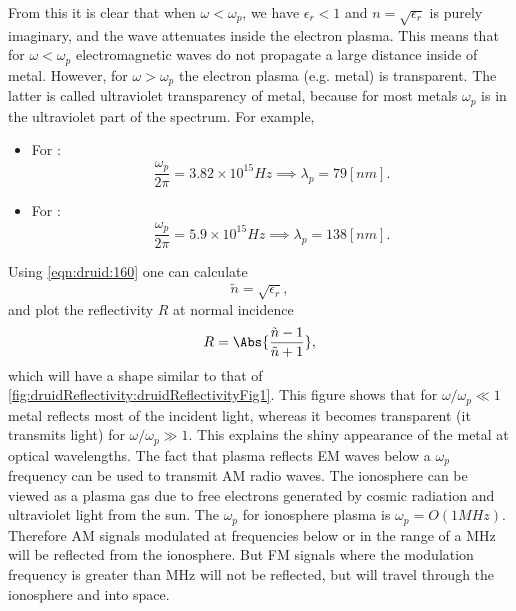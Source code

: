 %
From this it is clear that when \( \omega < \omega_p \), we have \( \epsilon_r < 1 \) and \( n = \sqrt{\epsilon_r} \) is purely imaginary, and the wave attenuates inside the electron plasma.
%
This means that for \( \omega < \omega_p \) electromagnetic waves do not propagate a large distance inside of metal.  However, for \( \omega > \omega_p \) the electron plasma (e.g. metal) is transparent.  The latter is called ultraviolet transparency of metal, because for most metals \( \omega_p \) is in the ultraviolet part of the spectrum.  For example,
%
\begin{itemize}
\item For :
\begin{dmath}\label{eqn:druid:180}
\frac{\omega_p}{2 \pi} = 3.82 \times 10^{15} \si{Hz} \implies \lambda_p = 79 [nm].
\end{dmath}
\item For :
\begin{dmath}\label{eqn:druid:200}
\frac{\omega_p}{2 \pi} = 5.9 \times 10^{15} \si{Hz} \implies \lambda_p = 138 [nm].
\end{dmath}
\end{itemize}
%
Using \cref{eqn:druid:160} one can calculate
%
\begin{dmath}\label{eqn:druid:220}
\tilde{n} = \sqrt{\epsilon_r},
\end{dmath}
%
and plot the reflectivity \( R \) at normal incidence
%
\begin{dmath}\label{eqn:druid:240}
R = \Abs{ \frac{\tilde{n} - 1 }{\tilde{n} + 1} },
\end{dmath}
%
which will have a shape similar to that of \cref{fig:druidReflectivity:druidReflectivityFig1}.
%
%
This figure shows that for \( \omega/\omega_p \ll 1 \) metal reflects most of the incident light, whereas it becomes transparent (it transmits light) for \( \omega/\omega_p \gg 1 \).  This explains the shiny appearance of the metal at optical wavelengths.
%
The fact that plasma reflects EM waves below a \( \omega_p \) frequency can be used to transmit AM radio waves.  The ionosphere can be viewed as a plasma gas due to free electrons generated by cosmic radiation and ultraviolet light from the sun.  The \( \omega_p \) for ionosphere plasma is \( \omega_p = O(1 \si{MHz}) \).  Therefore AM signals modulated at frequencies below or in the range of a \si{MHz} will be reflected from the ionosphere.  But FM signals where the modulation frequency is greater than \si{MHz} will not be reflected, but will travel through the ionosphere and into space.
%
